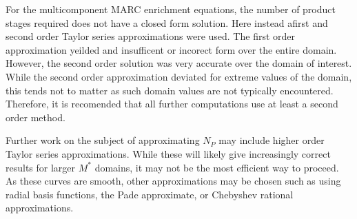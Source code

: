 \documentclass{ansconf}
\begin{document}
For the multicomponent MARC enrichment equations, the number of product stages 
required does not have a closed form solution.  Here instead afirst and second 
order Taylor series approximations were used.  The first order approximation 
yeilded and insufficent or incorect form over the entire domain.  However, 
the second order solution was very accurate over the domain of interest.  While 
the second order approximation deviated for extreme values of the domain, this 
tends not to matter as such domain values are not typically encountered.  
Therefore, it is recomended that all further computations use at least a second order
method.

Further work on the subject of approximating $N_P$ may include higher order Taylor
series approximations.  While these will likely give increasingly correct results 
for larger $M^*$ domains, it may not be the most efficient way to proceed.  
As these curves are smooth, other approximations may be chosen such as using 
radial basis functions, the Pade approximate, or Chebyshev rational approximations.

\setlength{\baselineskip}{12pt}



\end{document}
